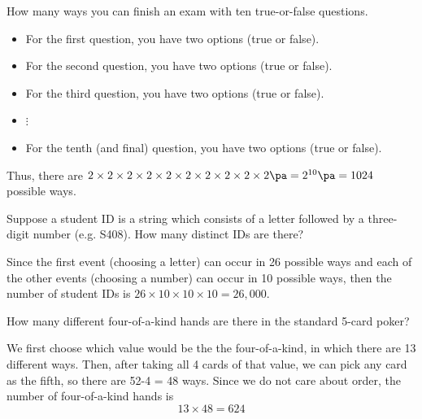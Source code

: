 \begin{frame}
\end{frame}


\begin{frame}[t]
\begin{ex}
How many ways you can finish an exam with ten true-or-false questions.
\end{ex}
\begin{sol}
\begin{itemize}
\item For the first question, you have two options (true or false). \pa
\item For the second question, you have two options (true or false). \pa
\item For the third question, you have two options (true or false). \pa
\item $\vdots$
\item For the tenth (and final) question, you have two options (true or false).
\end{itemize}
Thus, there are $2 \times 2 \times 2 \times 2 \times 2 \times 2 \times 2 \times 2 \times 2 \times 2 \pa = 2^{10} \pa = 1024$ possible ways.
\end{sol}
\end{frame}

\begin{frame}[t]
\begin{ex}
Suppose a student ID is a string which consists of a letter followed by a three-digit number (e.g. S408). How many distinct IDs are there?
\end{ex}
\begin{sol}
Since the first event (choosing a letter) can occur in 26 possible ways and each of the other events (choosing a number) can occur in 10 possible ways, then the number of student IDs is $26 \times 10 \times 10 \times 10 = 26,000$.
\end{sol}
\end{frame}


\begin{frame}[t]
\begin{ex}
How many different four-of-a-kind hands are there in the standard 5-card poker?
\end{ex}
\begin{sol}
We first choose which value would be the the four-of-a-kind, in which there are 13 different ways. Then, after taking all 4 cards of that value, we can pick any card as the fifth, so there are 52-4 = 48 ways. Since we do not care about order, the number of four-of-a-kind hands is
\[ 13 \times 48 = 624\]
\end{sol}
\end{frame}


